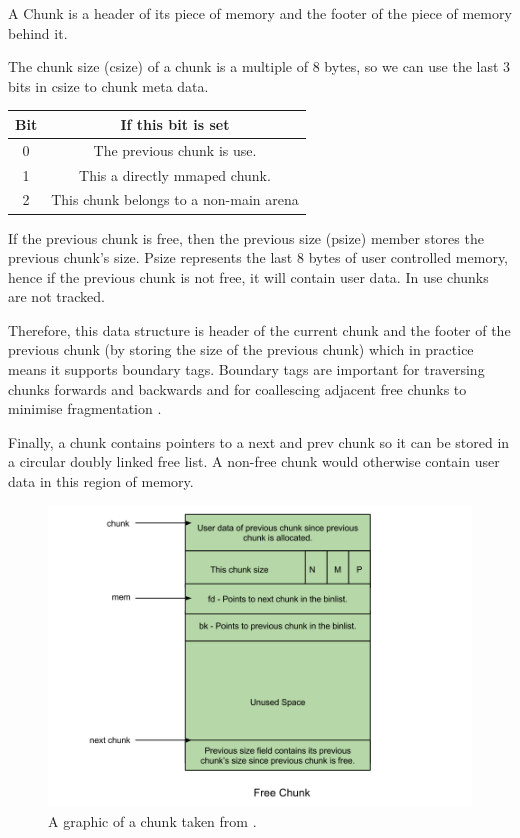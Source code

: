 \documentclass{article}
\begin{document}
A Chunk is a header of its piece of memory and the footer of the piece of memory behind it.

The chunk size (csize) of a chunk is a multiple of 8 bytes, so we can use the last 3 bits in csize to chunk meta data. 

\begin{tabular}{ c | c }
  Bit & If this bit is set \\ \hline	
  0 & The previous chunk is use. \\
  1 & This a directly mmaped chunk. \\
  2 & This chunk belongs to a non-main arena \\
\end{tabular}

If the previous chunk is free, then the previous size (psize) member stores the previous chunk's size. Psize represents the last 8 bytes of user controlled memory, hence if the previous chunk is not free, it will contain user data. In use chunks are not tracked. 

Therefore, this data structure is header of the current chunk and the footer of the previous chunk (by storing the size of the previous chunk) which in practice means it supports boundary tags. Boundary tags are important for traversing chunks forwards and backwards and for coallescing adjacent free chunks to minimise fragmentation \cite{douglee}. 

Finally, a chunk contains pointers to a next and prev chunk so it can be stored in a circular doubly linked free list. A non-free chunk would otherwise contain user data in this region of memory.

\begin{figure}[!htb]
\caption{A graphic of a chunk taken from \cite{sploitfun}.}
\includegraphics[scale=0.3]{image/chunk.png}
\end{figure}
\end{document}
